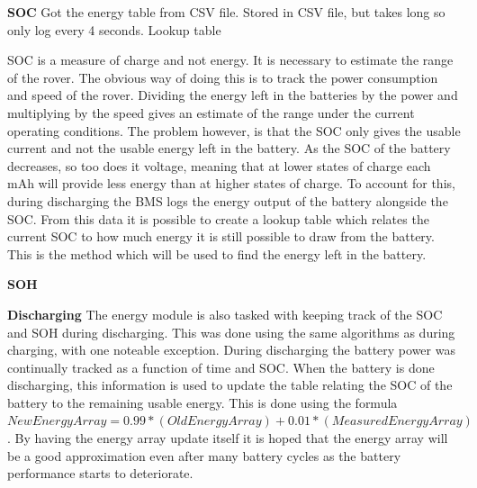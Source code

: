 \documentclass[a4paper]{article}
\begin{document}
\textbf{SOC}
\vspace{10pt} 
\newline
Got the energy table from CSV file.
Stored in CSV file, but takes long so only log every 4 seconds.
Lookup table

SOC is a measure of charge and not energy. It is necessary to estimate 
the range of the rover. The obvious way of doing this is to track the 
power consumption and speed of the rover. Dividing the energy left in 
the batteries by the power and multiplying by the speed gives an estimate 
of the range under the current operating conditions. The problem however, 
is that the SOC only gives the usable current and not the usable energy 
left in the battery. As the SOC of the battery decreases, so too does it 
voltage, meaning that at lower states of charge each mAh will provide less 
energy than at higher states of charge. To account for this, during discharging 
the BMS logs the energy output of the battery alongside the SOC. From this data 
it is possible to create a lookup table which relates the current SOC to how 
much energy it is still possible to draw from the battery. This is the method 
which will be used to find the energy left in the battery.

\textbf{SOH}
\vspace{10pt} 
\newline

\textbf{Discharging}
\vspace{10pt} 
\newline
The energy module is also tasked with keeping track of the SOC and SOH during discharging.
This was done using the same algorithms as during charging, with one noteable exception.
During discharging the battery power was continually tracked as a function of time and
SOC. When the battery is done discharging, this information is used to update the table
relating the SOC of the battery to the remaining usable energy. This is done using the
formula \( New Energy Array = 0.99*(Old Energy Array) + 0.01*(Measured Energy Array) \). 
By having the energy array update itself it is hoped that the energy array will be a good
approximation even after many battery cycles as the battery performance starts to deteriorate.
\end{document}

